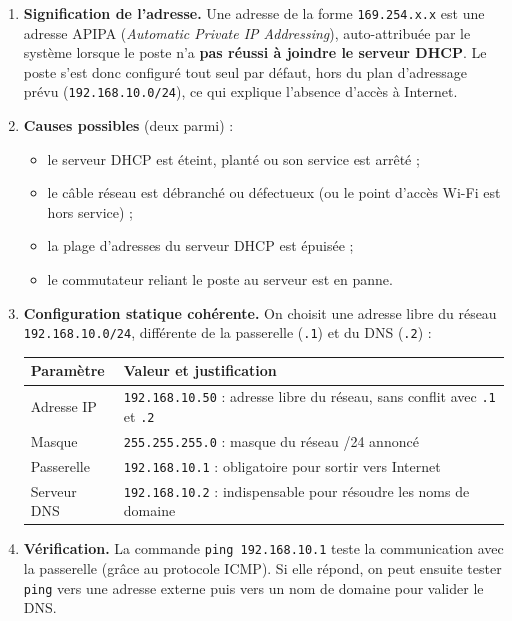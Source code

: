 \documentclass[11pt]{article}
\newcommand{\cle}[1]{{\popxbold\color{popdark}#1}}
\begin{document}
\begin{corrige}[Exercice 8 — Dépannage \cle{DHCP}]
\begin{enumerate}
\item \textbf{Signification de l'adresse.} Une adresse de la forme \texttt{169.254.x.x} est une adresse \cle{APIPA} (\emph{Automatic Private IP Addressing}), auto-attribuée par le système lorsque le poste n'a \textbf{pas réussi à joindre le serveur DHCP}. Le poste s'est donc configuré tout seul par défaut, hors du plan d'adressage prévu (\texttt{192.168.10.0/24}), ce qui explique l'absence d'accès à Internet.
\item \textbf{Causes possibles} (deux parmi) :
\begin{itemize}
\item le serveur \cle{DHCP} est éteint, planté ou son service est arrêté ;
\item le câble réseau est débranché ou défectueux (ou le point d'accès Wi-Fi est hors service) ;
\item la plage d'adresses du serveur \cle{DHCP} est épuisée ;
\item le commutateur reliant le poste au serveur est en panne.
\end{itemize}
\item \textbf{Configuration statique cohérente.} On choisit une adresse libre du réseau \texttt{192.168.10.0/24}, différente de la passerelle (\texttt{.1}) et du DNS (\texttt{.2}) :
\begin{center}
\begin{tabularx}{\linewidth}{|l|X|}
\hline
\rowcolor{popblueL} \textbf{Paramètre} & \textbf{Valeur et justification} \\
\hline
Adresse IP & \texttt{192.168.10.50} : adresse libre du réseau, sans conflit avec \texttt{.1} et \texttt{.2} \\
\hline
Masque & \texttt{255.255.255.0} : masque du réseau /24 annoncé \\
\hline
Passerelle & \texttt{192.168.10.1} : obligatoire pour sortir vers Internet \\
\hline
Serveur DNS & \texttt{192.168.10.2} : indispensable pour résoudre les noms de domaine \\
\hline
\end{tabularx}
\end{center}
\item \textbf{Vérification.} La commande \texttt{ping 192.168.10.1} teste la communication avec la passerelle (grâce au protocole \cle{ICMP}). Si elle répond, on peut ensuite tester \texttt{ping} vers une adresse externe puis vers un nom de domaine pour valider le \cle{DNS}.
\end{enumerate}
\end{corrige}
\end{document}
